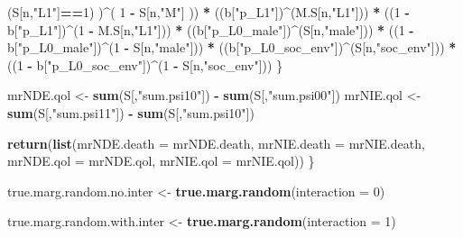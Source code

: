\documentclass[
]{book}
\newenvironment{Shaded}{\begin{snugshade}}{\end{snugshade}}
\newcommand{\AttributeTok}[1]{\textcolor[rgb]{0.13,0.29,0.53}{#1}}
\newcommand{\DecValTok}[1]{\textcolor[rgb]{0.00,0.00,0.81}{#1}}
\newcommand{\FunctionTok}[1]{\textcolor[rgb]{0.13,0.29,0.53}{\textbf{#1}}}
\newcommand{\NormalTok}[1]{#1}
\newcommand{\OtherTok}[1]{\textcolor[rgb]{0.56,0.35,0.01}{#1}}
\newcommand{\SpecialCharTok}[1]{\textcolor[rgb]{0.81,0.36,0.00}{\textbf{#1}}}
\newcommand{\StringTok}[1]{\textcolor[rgb]{0.31,0.60,0.02}{#1}}
\begin{document}
\begin{Shaded}
\begin{Highlighting}[]
\NormalTok{          (S[n,}\StringTok{"L1"}\NormalTok{]}\SpecialCharTok{==}\DecValTok{1}\NormalTok{) )}\SpecialCharTok{\^{}}\NormalTok{( }\DecValTok{1} \SpecialCharTok{{-}}\NormalTok{ S[n,}\StringTok{"M"}\NormalTok{] )) }\SpecialCharTok{*}
\NormalTok{      ((b[}\StringTok{"p\_L1"}\NormalTok{])}\SpecialCharTok{\^{}}\NormalTok{(M.S[n,}\StringTok{"L1"}\NormalTok{])) }\SpecialCharTok{*}
\NormalTok{      ((}\DecValTok{1} \SpecialCharTok{{-}}\NormalTok{ b[}\StringTok{"p\_L1"}\NormalTok{])}\SpecialCharTok{\^{}}\NormalTok{(}\DecValTok{1} \SpecialCharTok{{-}}\NormalTok{ M.S[n,}\StringTok{"L1"}\NormalTok{])) }\SpecialCharTok{*}
\NormalTok{      ((b[}\StringTok{"p\_L0\_male"}\NormalTok{])}\SpecialCharTok{\^{}}\NormalTok{(S[n,}\StringTok{"male"}\NormalTok{])) }\SpecialCharTok{*} 
\NormalTok{      ((}\DecValTok{1} \SpecialCharTok{{-}}\NormalTok{ b[}\StringTok{"p\_L0\_male"}\NormalTok{])}\SpecialCharTok{\^{}}\NormalTok{(}\DecValTok{1} \SpecialCharTok{{-}}\NormalTok{ S[n,}\StringTok{"male"}\NormalTok{])) }\SpecialCharTok{*} 
\NormalTok{      ((b[}\StringTok{"p\_L0\_soc\_env"}\NormalTok{])}\SpecialCharTok{\^{}}\NormalTok{(S[n,}\StringTok{"soc\_env"}\NormalTok{])) }\SpecialCharTok{*}
\NormalTok{      ((}\DecValTok{1} \SpecialCharTok{{-}}\NormalTok{ b[}\StringTok{"p\_L0\_soc\_env"}\NormalTok{])}\SpecialCharTok{\^{}}\NormalTok{(}\DecValTok{1} \SpecialCharTok{{-}}\NormalTok{ S[n,}\StringTok{"soc\_env"}\NormalTok{])) }
\NormalTok{    \}}
  
\NormalTok{  mrNDE.qol }\OtherTok{\textless{}{-}} \FunctionTok{sum}\NormalTok{(S[,}\StringTok{"sum.psi10"}\NormalTok{]) }\SpecialCharTok{{-}} \FunctionTok{sum}\NormalTok{(S[,}\StringTok{"sum.psi00"}\NormalTok{])}
\NormalTok{  mrNIE.qol }\OtherTok{\textless{}{-}} \FunctionTok{sum}\NormalTok{(S[,}\StringTok{"sum.psi11"}\NormalTok{]) }\SpecialCharTok{{-}} \FunctionTok{sum}\NormalTok{(S[,}\StringTok{"sum.psi10"}\NormalTok{])}
  
  \FunctionTok{return}\NormalTok{(}\FunctionTok{list}\NormalTok{(}\AttributeTok{mrNDE.death =}\NormalTok{ mrNDE.death, }\AttributeTok{mrNIE.death =}\NormalTok{ mrNIE.death, }
              \AttributeTok{mrNDE.qol =}\NormalTok{ mrNDE.qol, }\AttributeTok{mrNIE.qol =}\NormalTok{ mrNIE.qol))}
\NormalTok{\}}
\end{Highlighting}
\end{Shaded}

\begin{Shaded}
\begin{Highlighting}[]
\NormalTok{true.marg.random.no.inter }\OtherTok{\textless{}{-}} \FunctionTok{true.marg.random}\NormalTok{(}\AttributeTok{interaction =} \DecValTok{0}\NormalTok{)}

\NormalTok{true.marg.random.with.inter }\OtherTok{\textless{}{-}} \FunctionTok{true.marg.random}\NormalTok{(}\AttributeTok{interaction =} \DecValTok{1}\NormalTok{)}
\end{Highlighting}
\end{Shaded}
\end{document}
